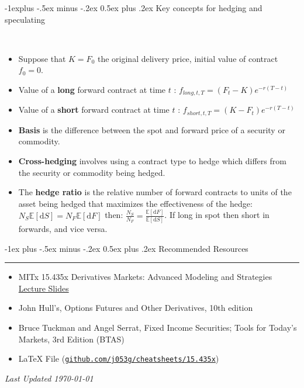 \documentclass[10pt,landscape,a4paper]{article}
\makeatletter
\renewcommand{\section}{\@startsection{section}{1}{0mm}%
                                {-1ex plus -.5ex minus -.2ex}%
                                {0.5ex plus .2ex}%
                                {\normalfont\large\bfseries}}
\renewcommand{\subsection}{\@startsection{subsection}{2}{0mm}%
                                {-1explus -.5ex minus -.2ex}%
                                {0.5ex plus .2ex}%
                                {\normalfont\normalsize\bfseries}}
\makeatother
\begin{document}
\begin{multicols*}{3}
\subsection{Key concepts for hedging and speculating}
  \begin{description}[topsep=0pt]
	\item[Valuing a forward contract over time] ~
	\begin{itemize}[topsep=0pt]
		\item Suppose that $K=F_0$ the original delivery price, initial value of contract $f_0=0$.
		\item Value of a \textbf{long} forward contract at time $t$ :  $f_{long,t,T} = (F_t-K) e ^{-r(T-t)}$ 
		\item Value of a \textbf{short} forward contract at time $t$ :  $f_{short,t,T} = (K-F_t) e ^{-r(T-t)}$ 
		\item \textbf{Basis} is the difference between the spot and forward price
		of a security or commodity.
		\item \textbf{Cross-hedging} involves using a contract type to hedge
		which differs from the security or commodity being hedged.
		\item The \textbf{hedge ratio} is the relative number of forward contracts to units
		of the asset being hedged that maximizes the effectiveness of the hedge:  $N_S \mathbb{E}[\text{d}S] = N_F \mathbb{E}[\text{d}F] $ then: $\frac{N_S}{N_F} = \frac{\mathbb{E}[\text{d}F]}{\mathbb{E}[\text{d}S]}$. If long in spot then short in forwards, and vice versa.
	\end{itemize}
\end{description}
 
\newpage

\section{Recommended Resources} \smallskip \hrule height 1pt \smallskip

\bigskip

\begin{itemize}
\item MITx 15.435x 
Derivatives Markets: Advanced Modeling and Strategies \href{https://learning.edx.org/course/course-v1:MITx+15.435x+1T2021/home}{Lecture Slides}

\item John Hull’s, Options Futures and Other Derivatives, 10th edition
\item Bruce Tuckman and Angel Serrat, Fixed Income Securities; Tools for Today’s Markets, 3rd Edition (BTAS) 
\item LaTeX File (\texttt{\href{https://github.com/j053g/cheatsheets/blob/main/15.435x/15.435x_derivatives_markets.tex}{github.com/j053g/cheatsheets/15.435x}})
\end{itemize}

\begin{center}
	\emph{Last Updated \today}
\end{center}

\end{multicols*}
\end{document}
